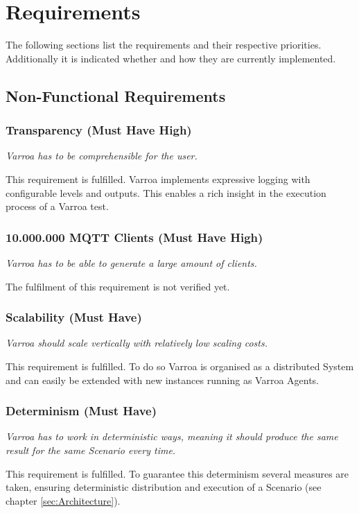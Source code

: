 \chapter{Requirements}
The following sections list the requirements and their respective priorities.
Additionally it is indicated whether and how they are currently implemented.

\section{Non-Functional Requirements}

\subsection{Transparency (Must Have High)}\label{sec:Transparency}
\emph{Varroa has to be comprehensible for the user.}

This requirement is fulfilled.
Varroa implements expressive logging with configurable levels and outputs.
This enables a rich insight in the execution process of a Varroa test.

\subsection{10.000.000 MQTT Clients (Must Have High)} 
\emph{Varroa has to be able to generate a large amount of clients.}

The fulfilment of this requirement is not verified yet.

\subsection{Scalability (Must Have)} 
\emph{Varroa should scale vertically with relatively low scaling costs.}

This requirement is fulfilled.
To do so Varroa is organised as a distributed System and can easily be extended with new instances running as Varroa Agents.

\subsection{Determinism (Must Have)} 
\emph{Varroa has to work in deterministic ways, meaning it should produce the same result for the same Scenario every time.}

This requirement is fulfilled.
To guarantee this determinism several measures are taken, ensuring deterministic distribution and execution of a Scenario (see chapter \ref{sec:Architecture}).

